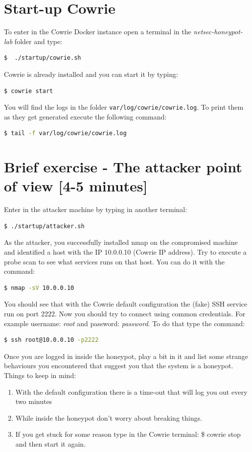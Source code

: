 \documentclass[epsfig,a4paper,11pt,titlepage,oneside,openany]{book}
\begin{document}
\section{Start-up Cowrie}
To enter in the Cowrie Docker instance open a terminal in the \textit{netsec-honeypot-lab} folder and type:
\begin{lstlisting}[language=bash]
$  ./startup/cowrie.sh
\end{lstlisting}
Cowrie is already installed and you can start it by typing:
\begin{lstlisting}[language=bash]
$ cowrie start
\end{lstlisting}
You will find the logs in the folder \texttt{var/log/cowrie/cowrie.log}. To print them as they get generated execute the following command:
\begin{lstlisting}[language=bash]
$ tail -f var/log/cowrie/cowrie.log
\end{lstlisting}

\section{Brief exercise - The attacker point of view [4-5 minutes]}
Enter in the attacker machine by typing in another terminal:
\begin{lstlisting}[language=bash]
$ ./startup/attacker.sh
\end{lstlisting}
As the attacker, you successfully installed nmap on the compromised machine and identified a host with the IP 10.0.0.10 (Cowrie IP address). Try to execute a probe scan to see what services runs on that host. You can do it with the command:
\begin{lstlisting}[language=bash]
$ nmap -sV 10.0.0.10
\end{lstlisting}
You should see that with the Cowrie default configuration the (fake) SSH service run on port 2222.
Now you should try to connect using common credentials. For example username: \textit{root} and password: \textit{password}. To do that type the command:
\begin{lstlisting}[language=bash]
$ ssh root@10.0.0.10 -p2222
\end{lstlisting}
Once you are logged in inside the honeypot, play a bit in it and list some strange behaviours you encountered that suggest you that the system is a honeypot.
Things to keep in mind:
\begin{enumerate}
\itemsep0em
\item With the default configuration there is a time-out that will log you out every two minutes
\item While inside the honeypot don't worry about breaking things.
\item If you get stuck for some reason type in the Cowrie terminal: \$ cowrie stop and then start it again.
\end{enumerate}
\end{document}
